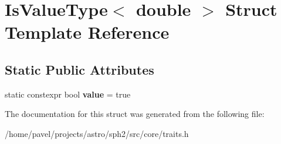 \hypertarget{structIsValueType_3_01double_01_4}{}\section{Is\+Value\+Type$<$ double $>$ Struct Template Reference}
\label{structIsValueType_3_01double_01_4}
\subsection*{Static Public Attributes}
\begin{DoxyCompactItemize}
\item 
\hypertarget{structIsValueType_3_01double_01_4_a549187b8340852dfd8538023625f5ee2}{}\label{structIsValueType_3_01double_01_4_a549187b8340852dfd8538023625f5ee2} 
static constexpr bool {\bfseries value} = true
\end{DoxyCompactItemize}


The documentation for this struct was generated from the following file\+:\begin{DoxyCompactItemize}
\item 
/home/pavel/projects/astro/sph2/src/core/traits.\+h\end{DoxyCompactItemize}
